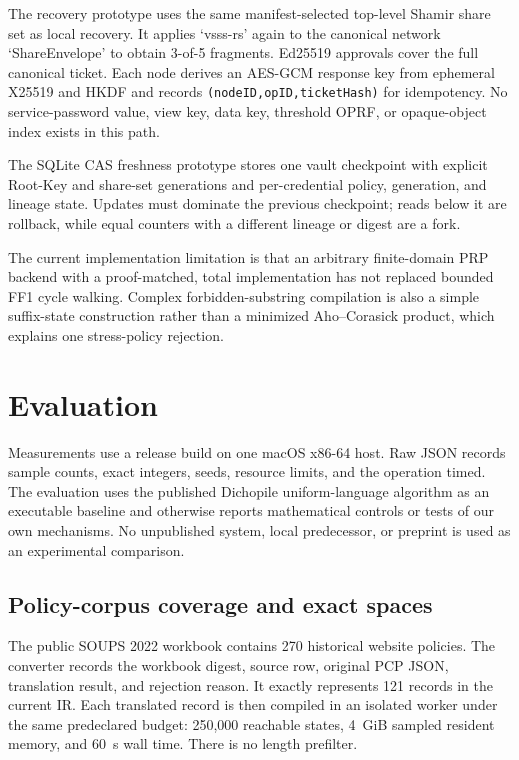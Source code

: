 \documentclass[preprint,12pt]{elsarticle}
\begin{document}
The recovery prototype uses the same manifest-selected top-level Shamir share
set as local recovery. It applies `vsss-rs' again to the canonical network
`ShareEnvelope' to obtain 3-of-5 fragments. Ed25519 approvals cover the full
canonical ticket. Each node derives an AES-GCM response key from ephemeral
X25519 and HKDF and records \texttt{(nodeID,opID,ticketHash)} for idempotency.
No service-password value, view key, data key, threshold OPRF, or opaque-object
index exists in this path.

The SQLite CAS freshness prototype stores one vault checkpoint with explicit
Root-Key and share-set generations and per-credential policy, generation, and
lineage state. Updates must dominate the previous checkpoint; reads below it
are rollback, while equal counters with a different lineage or digest are a
fork.

The current implementation limitation is that an arbitrary finite-domain PRP
backend with a proof-matched, total implementation has not replaced bounded
FF1 cycle walking. Complex forbidden-substring compilation is also a simple
suffix-state construction rather than a minimized Aho--Corasick product, which
explains one stress-policy rejection.

\section{Evaluation}

Measurements use a release build on one macOS x86-64 host. Raw JSON records
sample counts, exact integers, seeds, resource limits, and the operation timed.
The evaluation uses the published Dichopile uniform-language algorithm as an
executable baseline and otherwise reports mathematical controls or tests of
our own mechanisms. No unpublished system, local predecessor, or preprint is
used as an experimental comparison.

\subsection{Policy-corpus coverage and exact spaces}

The public SOUPS 2022 workbook contains 270 historical website policies. The
converter records the workbook digest, source row, original PCP JSON,
translation result, and rejection reason. It exactly represents 121 records in
the current IR. Each translated record is then compiled in an isolated worker
under the same predeclared budget: 250,000 reachable states, 4~GiB sampled
resident memory, and 60~s wall time. There is no length prefilter.
\end{document}
